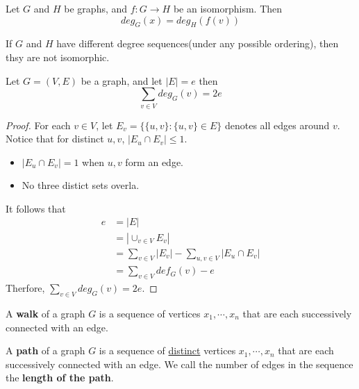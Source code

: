 \begin{theorem}
    Let $G$ and $H$ be graphs, and $f:G \longrightarrow H$ be an isomorphism. 
    Then $$deg_G(x)=deg_{H}(f(v))$$
\end{theorem}


\begin{corollary}
    If $G$ and $H$ have different degree sequences(under any possible ordering), then thsy are not isomorphic.
\end{corollary}

\begin{lemma}
    Let $G=(V,E)$ be a graph, and let $|E|=e$ then $$\sum_{v \in V}deg_G(v)=2e$$
\end{lemma}
\begin{proof}
    For each $v \in V$, let $E_v=\{\{u,v\}:\{u,v\}\in E\}$ denotes all edges around $v$. 
    Notice that for distinct $u,v$, $|E_u \cap E_v| \leq 1$.
    \begin{itemize}
        \item $|E_u \cap E_v| = 1$ when $u,v$ form an edge.
        \item No three distict sets overla.
    \end{itemize}
    It follows that
    \begin{equation}
        \begin{split}
            e &= |E|\\
            &=|\cup_{v \in V}E_v|\\
            &= \sum_{v \in V}|E_v| - \sum_{u,v \in V}|E_u \cap E_v|\\
            &= \sum_{v \in V}def_G(v)-e
        \end{split}
    \end{equation}
    Therfore, $\sum_{v \in V}deg_G(v)=2e$.
\end{proof}


\begin{definition}
    A \textbf{walk} of a graph $G$ is a sequence of vertices $x_1,\cdots,x_n$ that are each successively connected with an edge.
\end{definition}

\begin{definition}
    A \textbf{path} of a graph $G$ is a sequence of \underline{distinct} vertices $x_1,\cdots,x_n$ that are each successively connected with an edge. 
    We call the number of edges in the sequence the \textbf{length of the path}. 
\end{definition}


